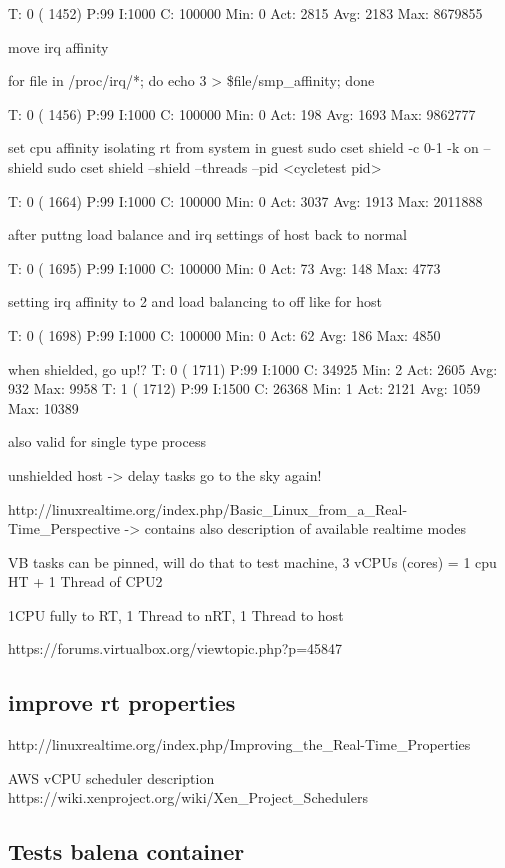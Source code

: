 \documentclass[]{scrartcl}
\begin{document}
T: 0 ( 1452) P:99 I:1000 C: 100000 Min:      0 Act: 2815 Avg: 2183 Max:  8679855

move irq affinity

for file in /proc/irq/*; do   echo 3 > \$file/smp_affinity; done

T: 0 ( 1456) P:99 I:1000 C: 100000 Min:      0 Act:  198 Avg: 1693 Max:  9862777

set cpu affinity isolating rt from system in guest
sudo cset shield -c 0-1 -k on --shield
sudo cset shield --shield --threads --pid <cycletest pid>

T: 0 ( 1664) P:99 I:1000 C: 100000 Min:      0 Act: 3037 Avg: 1913 Max:  2011888

after puttng load balance and irq settings of host back to normal

T: 0 ( 1695) P:99 I:1000 C: 100000 Min:      0 Act:   73 Avg:  148 Max:    4773

setting irq affinity to 2
and load balancing to off like for host

T: 0 ( 1698) P:99 I:1000 C: 100000 Min:      0 Act:   62 Avg:  186 Max:    4850

when shielded, go up!?
T: 0 ( 1711) P:99 I:1000 C:  34925 Min:      2 Act: 2605 Avg:  932 Max:    9958
T: 1 ( 1712) P:99 I:1500 C:  26368 Min:      1 Act: 2121 Avg: 1059 Max:   10389

also valid for single type process


unshielded host -> delay tasks go to the sky again!


http://linuxrealtime.org/index.php/Basic_Linux_from_a_Real-Time_Perspective
-> contains also description of available realtime modes


VB tasks can be pinned, will do that to test machine, 3 vCPUs (cores) = 1 cpu HT + 1 Thread of CPU2

1CPU fully to RT, 1 Thread to nRT, 1 Thread to host

https://forums.virtualbox.org/viewtopic.php?p=45847


\subsection{improve rt properties}

http://linuxrealtime.org/index.php/Improving_the_Real-Time_Properties


AWS vCPU scheduler description
https://wiki.xenproject.org/wiki/Xen_Project_Schedulers



\subsection{Tests balena container}
\end{document}
